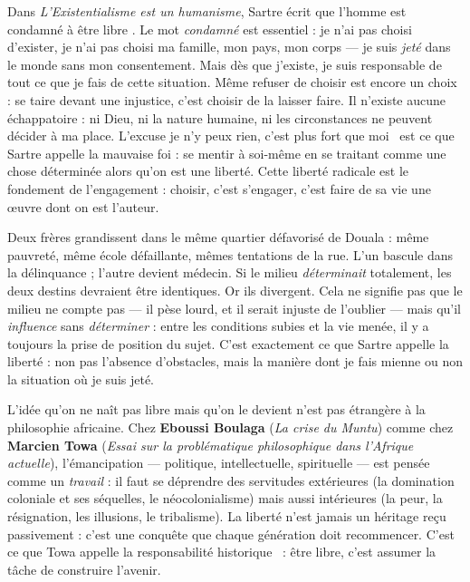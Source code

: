 \documentclass[11pt]{article}
\newcommand{\cle}[1]{{\popxbold\color{popdark}#1}}
\begin{document}
\begin{propriete}
Dans \emph{L'Existentialisme est un humanisme}, Sartre écrit que l'homme est \guillemotleft condamné à être libre \guillemotright. Le mot \emph{condamné} est essentiel : je n'ai pas choisi d'exister, je n'ai pas choisi ma famille, mon pays, mon corps — je suis \emph{jeté} dans le monde sans mon consentement. Mais dès que j'existe, je suis responsable de tout ce que je fais de cette situation. Même refuser de choisir est encore un choix : se taire devant une injustice, c'est choisir de la laisser faire. Il n'existe aucune échappatoire : ni Dieu, ni la nature humaine, ni les circonstances ne peuvent décider à ma place. L'excuse \guillemotleft je n'y peux rien, c'est plus fort que moi \guillemotright\ est ce que Sartre appelle la \cle{mauvaise foi} : se mentir à soi-même en se traitant comme une chose déterminée alors qu'on est une liberté. Cette liberté radicale est le fondement de l'\cle{engagement} : choisir, c'est s'engager, c'est faire de sa vie une œuvre dont on est l'auteur.
\end{propriete}

\begin{exemplebox}
Deux frères grandissent dans le même quartier défavorisé de Douala : même pauvreté, même école défaillante, mêmes tentations de la rue. L'un bascule dans la délinquance ; l'autre devient médecin. Si le milieu \emph{déterminait} totalement, les deux destins devraient être identiques. Or ils divergent. Cela ne signifie pas que le milieu ne compte pas — il pèse lourd, et il serait injuste de l'oublier — mais qu'il \emph{influence} sans \emph{déterminer} : entre les conditions subies et la vie menée, il y a toujours la prise de position du sujet. C'est exactement ce que Sartre appelle la liberté : non pas l'absence d'obstacles, mais la manière dont je fais mienne ou non la situation où je suis jeté.
\end{exemplebox}

\begin{savaistu}
L'idée qu'on ne naît pas libre mais qu'on le devient n'est pas étrangère à la philosophie africaine. Chez \textbf{Eboussi Boulaga} (\emph{La crise du Muntu}) comme chez \textbf{Marcien Towa} (\emph{Essai sur la problématique philosophique dans l'Afrique actuelle}), l'émancipation — politique, intellectuelle, spirituelle — est pensée comme un \emph{travail} : il faut se déprendre des servitudes extérieures (la domination coloniale et ses séquelles, le néocolonialisme) mais aussi intérieures (la peur, la résignation, les illusions, le tribalisme). La liberté n'est jamais un héritage reçu passivement : c'est une conquête que chaque génération doit recommencer. C'est ce que Towa appelle la \guillemotleft responsabilité historique \guillemotright\ : être libre, c'est assumer la tâche de construire l'avenir.
\end{savaistu}
\end{document}

